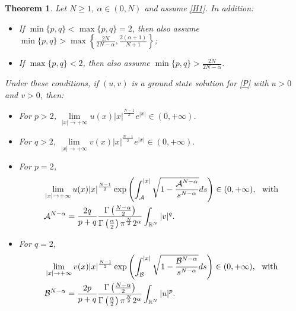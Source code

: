 \documentclass[12pt,a4paper]{article}
\newtheorem{theorem}{Theorem}[section]
\numberwithin{equation}{section}
\begin{document}
\begin{theorem}\label{decaimentosol}
Let $N\geq 1$, $\alpha\in (0, N)$ and assume \eqref{H1}. In addition:
\begin{itemize}
    \item[(i)] If $\min\{p,q\} < \max\{p,q\} =2$, then also assume $\min\{p,q\} > \max\left\{ \frac{2N}{2N-\alpha}, \frac{2(\alpha+1)}{N+1}\right\}$;

\item[(ii)] If $\max\{p,q\} <2$, then also assume $\min\{p,q\} >  \frac{2N}{2N-\alpha}$.

\end{itemize}
Under these conditions, if $(u, v)$ is a ground state solution for \eqref{P} with $u>0$ and $v>0$, then:
\begin{itemize}
    \item[(a)] For $p>2$, $\displaystyle \lim\limits_{|x|\rightarrow + \infty} u(x)|x|^{\frac{N-1}{2}}e^{|x|} \in (0, +\infty)$.
    
        \item[(b)] For $q>2$, $\lim\limits_{|x|\rightarrow + \infty} v(x)|x|^{\frac{N-1}{2}}e^{|x|} \in (0, +\infty) .$

\item[(c)] For $p=2$, 
\begin{align*}
&\lim\limits_{|x|\rightarrow + \infty} u(x)|x|^{\frac{N-1}{2}}\exp \left(\displaystyle \int_{\mathcal{A}}^{|x|}\sqrt{1-\dfrac{\mathcal{A}^{N-\alpha}}{s^{N-\alpha}}} ds\right) \in (0, +\infty), \ \ \text{with} \vspace{10pt}\\
&\mathcal{A}^{N-\alpha}=\dfrac{2q}{p+q}\dfrac{\Gamma\left(\frac{N-\alpha}{2}\right)}{\Gamma\left(\frac{\alpha}{2}\right)\pi^{\frac{N}{2}}2^{\alpha}}\displaystyle \int_{\mathbb{R}^N} |v|^q. \end{align*} 

\item[(d)] For $q=2$,
\begin{align*}
&\lim\limits_{|x|\rightarrow + \infty} v(x)|x|^{\frac{N-1}{2}}\exp \left(\displaystyle \int_{\mathcal{B}}^{|x|}\sqrt{1-\dfrac{\mathcal{B}^{N-\alpha}}{s^{N-\alpha}}} ds\right) \in (0, +\infty), \ \ \text{with} \vspace{10pt}\\ &\mathcal{B}^{N-\alpha}=\dfrac{2p}{p+q}\dfrac{\Gamma\left(\frac{N-\alpha}{2}\right)}{\Gamma\left(\frac{\alpha}{2}\right)\pi^{\frac{N}{2}}2^{\alpha}}\displaystyle \int_{\mathbb{R}^N} |u|^p.\end{align*}


\end{itemize}
\end{theorem}
\end{document}
